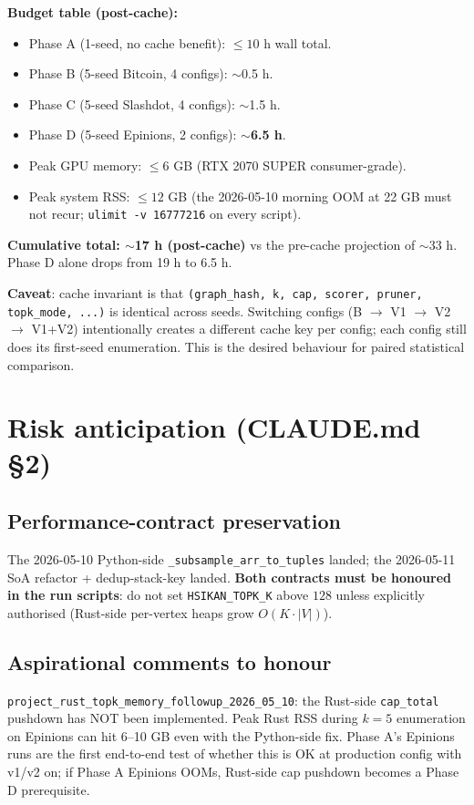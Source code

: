 \documentclass[11pt,a4paper]{article}
\begin{document}
\textbf{Budget table (post-cache):}
\begin{itemize}
\item Phase A (1-seed, no cache benefit): $\le 10$ h wall total.
\item Phase B (5-seed Bitcoin, 4 configs): $\sim$0.5 h.
\item Phase C (5-seed Slashdot, 4 configs): $\sim$1.5 h.
\item Phase D (5-seed Epinions, 2 configs): $\sim$\textbf{6.5 h}.
\item Peak GPU memory: $\le 6$ GB (RTX 2070 SUPER consumer-grade).
\item Peak system RSS: $\le 12$ GB (the 2026-05-10 morning OOM
  at 22 GB must not recur; \texttt{ulimit -v 16777216} on every
  script).
\end{itemize}

\textbf{Cumulative total: $\sim$\textbf{17 h} (post-cache)} vs the
pre-cache projection of $\sim$33 h.  Phase D alone drops from 19 h
to 6.5 h.

\textbf{Caveat}: cache invariant is that
\texttt{(graph\_hash, k, cap, scorer, pruner, topk\_mode, ...)} is
identical across seeds.  Switching configs (B $\to$ V1 $\to$ V2 $\to$
V1+V2) intentionally creates a different cache key per config; each
config still does its first-seed enumeration.  This is the desired
behaviour for paired statistical comparison.

\section{Risk anticipation (CLAUDE.md \S2)}

\subsection*{Performance-contract preservation}
The 2026-05-10 Python-side \texttt{\_subsample\_arr\_to\_tuples}
landed; the 2026-05-11 SoA refactor + dedup-stack-key landed.
\textbf{Both contracts must be honoured in the run scripts}: do
not set \texttt{HSIKAN\_TOPK\_K} above $128$ unless explicitly
authorised (Rust-side per-vertex heaps grow $O(K \cdot |V|)$).

\subsection*{Aspirational comments to honour}
\texttt{project\_rust\_topk\_memory\_followup\_2026\_05\_10}: the
Rust-side \texttt{cap\_total} pushdown has NOT been implemented.
Peak Rust RSS during $k{=}5$ enumeration on Epinions can hit
6--10 GB even with the Python-side fix.  Phase A's Epinions runs
are the first end-to-end test of whether this is OK at production
config with v1/v2 on; if Phase A Epinions OOMs, Rust-side cap
pushdown becomes a Phase D prerequisite.
\end{document}
